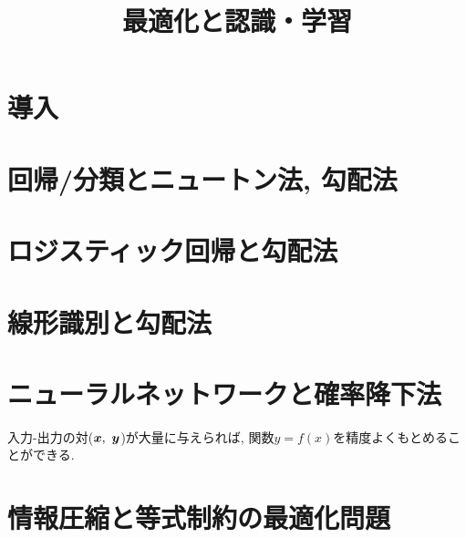 \documentclass[dvipdfmx,a4j]{jsarticle}
\title{最適化と認識・学習}
\author{}
\begin{document}
\maketitle 
\section{導入}

\section{回帰/分類とニュートン法, 勾配法}

\section{ロジスティック回帰と勾配法}

\section{線形識別と勾配法}

\section{ニューラルネットワークと確率降下法}
入力-出力の対($\mbox{\boldmath $x$},\ \mbox{\boldmath $y$}$)が大量に与えられば, 関数$y=f(x)$を精度よくもとめることができる.
\section{情報圧縮と等式制約の最適化問題}
  
\end{document}
